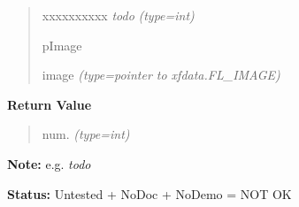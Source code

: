 \begin{boxedminipage}{\funcwidth}
\begin{quote}
\begin{Ventry}{xxxxxxxxxx}
\emph{todo}
            {\it (type=int)}

          \item[pImage]


image
            {\it (type=pointer to xfdata.FL\_IMAGE)}

        \end{Ventry}

      \end{quote}

      \textbf{Return Value}
    \vspace{-1ex}

      \begin{quote}

num.
      {\it (type=int)}

      \end{quote}

\textbf{Note:} 
e.g. \emph{todo}


\textbf{Status:} 
Untested + NoDoc + NoDemo = NOT OK


    \end{boxedminipage}

    \label{xformslib:flflimage:fl_j2pass_quantize_rgb}

    \vspace{0.5ex}

